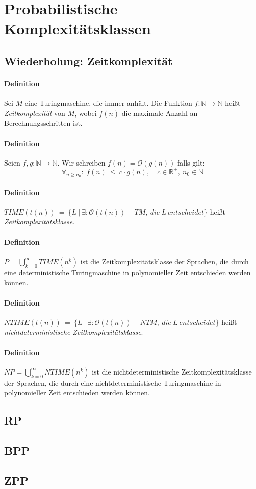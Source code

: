 \section{Probabilistische Komplexitätsklassen}


\subsection{Wiederholung: Zeitkomplexität}

\paragraph{Definition}
Sei $M$ eine Turingmaschine, die immer anhält.
Die Funktion $f:\mathbb{N}\to\mathbb{N}$ heißt \emph{Zeitkomplexität} von $M$, wobei $f(n)$ die maximale Anzahl an Berechnungsschritten ist.

\paragraph{Definition}
Seien $f,g:\mathbb{N}\to\mathbb{N}$.
Wir schreiben $f(n) = \mathcal{O}(g(n))$ falls gilt:
\begin{equation*}
	\forall_{n \geq n_0}:\ f(n)\ \leq \ c \cdot g(n), \quad c \in \mathbb{R}^+,\ n_0 \in \mathbb{N}
\end{equation*}

\paragraph{Definition}
$TIME(t(n))\ =\ \bigl\{L\ \bigl\vert\ \exists: \mathcal{O}(t(n))-TM,\ die\ L\ entscheidet \bigl\}$ heißt \emph{Zeitkomplexitätsklasse}.

\paragraph{Definition}
$P = \bigcup\limits_{k=0}^{\infty} TIME(n^k)$ ist die Zeitkomplexitätsklasse der Sprachen, die durch eine deterministische Turingmaschine in polynomieller Zeit entschieden werden können.

\paragraph{Definition}
$NTIME(t(n))\ =\ \bigl\{L\ \bigl\vert\ \exists: \mathcal{O}(t(n))-NTM,\ die\ L\ entscheidet \bigl\}$ heißt \emph{nichtdeterministische Zeitkomplexitätsklasse}.

\paragraph{Definition}
$NP = \bigcup\limits_{k=0}^{\infty} NTIME(n^k)$ ist die nichtdeterministische Zeitkomplexitätsklasse der Sprachen, die durch eine nichtdeterministische Turingmaschine in polynomieller Zeit entschieden werden können.


\subsection{RP}


\subsection{BPP}


\subsection{ZPP}
